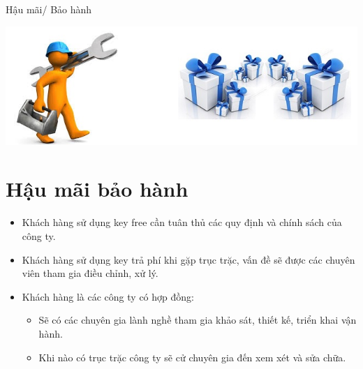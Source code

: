 \documentclass{beamer}
\begin{document}
\begin{frame}{Hậu mãi/ Bảo hành}
\begin{center}
\includegraphics[scale=0.5]{8.jpg}
\end{center}
\section{Hậu mãi bảo hành}
\begin{itemize}
\item Khách hàng sử dụng key free cần tuân thủ các quy định và chính sách của công ty.

\item Khách hàng sử dụng key trả phí khi gặp trục trặc, vấn đề sẽ được các chuyên viên tham gia điều chỉnh, xử lý.

\item Khách hàng là các công ty có hợp đồng:
\begin{itemize}
\item Sẽ có các chuyên gia lành nghề tham gia khảo sát, thiết kế, triển khai vận hành.
\item Khi nào có trục trặc công ty sẽ cử chuyên gia đến xem xét và sửa chữa.
\end{itemize}
\end{itemize}
\end{frame}
\end{document}
